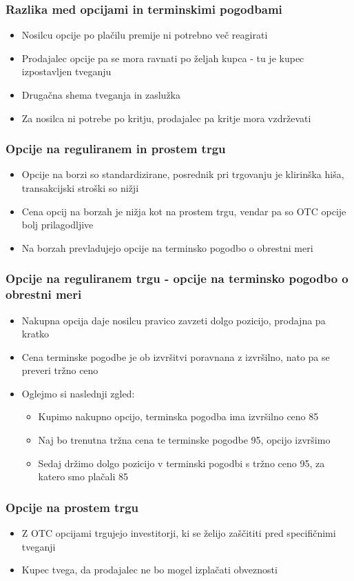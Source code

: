 \documentclass[14pt]{beamer}
\begin{document}
\begin{frame}
    \frametitle{Razlika med opcijami in terminskimi pogodbami}
    \begin{itemize}
        \item Nosilcu opcije po plačilu premije ni potrebno več reagirati
        \item Prodajalec opcije pa se mora ravnati po željah kupca - tu je kupec izpostavljen tveganju
        \pause
        \item Drugačna shema tveganja in zaslužka
        \pause
        \item Za nosilca ni potrebe po kritju, prodajalec pa kritje mora vzdrževati
    \end{itemize}
\end{frame}

\begin{frame}
    \frametitle{Opcije na reguliranem in prostem trgu}
    \begin{itemize}
        \item Opcije na borzi so standardizirane, posrednik pri trgovanju je klirinška hiša, transakcijski stroški so nižji
        \item Cena opcij na borzah je nižja kot na prostem trgu, vendar pa so OTC opcije bolj prilagodljive
        \item Na borzah prevladujejo opcije na terminsko pogodbo o obrestni meri
    \end{itemize}
\end{frame}

\begin{frame}
    \frametitle{Opcije na reguliranem trgu - opcije na terminsko pogodbo o obrestni meri}
    \begin{itemize}
        \item Nakupna opcija daje nosilcu pravico zavzeti dolgo pozicijo, prodajna pa kratko
        \item Cena terminske pogodbe je ob izvršitvi poravnana z izvršilno, nato pa se preveri tržno ceno
        \item Oglejmo si naslednji zgled:
        \begin{itemize}
            \item Kupimo nakupno opcijo, terminska pogodba ima izvršilno ceno 85\textdollar
            \item Naj bo trenutna tržna cena te terminske pogodbe 95\textdollar, opcijo izvršimo
            \item Sedaj držimo dolgo pozicijo v terminski pogodbi s tržno ceno 95\textdollar, za katero smo plačali 85\textdollar
        \end{itemize}
    \end{itemize}
\end{frame}

\begin{frame}    
    \frametitle{Opcije na prostem trgu}
    \begin{itemize}
        \item Z OTC opcijami trgujejo investitorji, ki se želijo zaščititi pred specifičnimi tveganji
        \item Kupec tvega, da prodajalec ne bo mogel izplačati obveznosti
    \end{itemize}
\end{frame}
\end{document}
